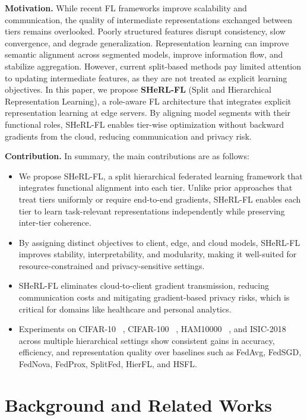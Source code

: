 \documentclass[letterpaper]{article} %
\begin{document}
     \textbf{Motivation.} While recent FL frameworks improve scalability and communication, the quality of intermediate representations exchanged between tiers remains overlooked. Poorly structured features disrupt consistency, slow convergence, and degrade generalization. Representation learning can improve semantic alignment across segmented models, improve information flow, and stabilize aggregation. However, current split-based methods pay limited attention to updating intermediate features, as they are not treated as explicit learning objectives. In this paper, we propose \textbf{SHeRL-FL} (Split and Hierarchical Representation Learning), a role-aware FL architecture that integrates explicit representation learning at edge servers. By aligning model segments with their functional roles, SHeRL-FL enables tier-wise optimization without backward gradients from the cloud, reducing communication and privacy risk.

    \textbf{Contribution.} In summary, the main contributions are as follows:
    \begin{itemize}
        \item We propose SHeRL-FL, a split hierarchical federated learning framework that integrates functional alignment into each tier. Unlike prior approaches that treat tiers uniformly or require end-to-end gradients, SHeRL-FL enables each tier to learn task-relevant representations independently while preserving inter-tier coherence.
        \item By assigning distinct objectives to client, edge, and cloud models, SHeRL-FL improves stability, interpretability, and modularity, making it well-suited for resource-constrained and privacy-sensitive settings.
        \item SHeRL-FL eliminates cloud-to-client gradient transmission, reducing communication costs and mitigating gradient-based privacy risks, which is critical for domains like healthcare and personal analytics.
        \item Experiments on CIFAR-10 ~\cite{krizhevsky2009learning}, CIFAR-100 ~\cite{krizhevsky2009learning}, HAM10000 ~\cite{tschandl2018ham10000}, and ISIC-2018 ~\cite{8363547} across multiple hierarchical settings show consistent gains in accuracy, efficiency, and representation quality over baselines such as FedAvg, FedSGD, FedNova, FedProx, SplitFed, HierFL, and HSFL.
    \end{itemize}


\section{Background and Related Works}
\end{document}
